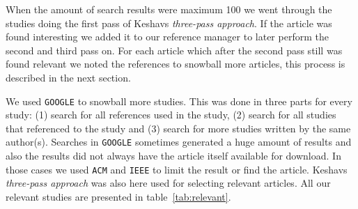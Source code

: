\documentclass[11pt, oneside]{article}   	%
\begin{document}
\FloatBarrier
{}
When the amount of search results were maximum 100 we went through the studies doing the first pass of Keshavs \emph{three-pass approach}\cite{Keshav}. If the article was found interesting we added it to our reference manager to later perform the second and third pass on. For each article which after the second pass still was found relevant we noted the references to snowball more articles, this process is described in the next section. 

We used \texttt{GOOGLE} to snowball more studies. This was done in three parts for every study: (1) search for all references used in the study, (2) search for all studies that referenced to the study and (3) search for more studies written by the same author(s). Searches in \texttt{GOOGLE} sometimes generated a huge amount of results and also the results did not always have the article itself available for download. In those cases we used \texttt{ACM} and \texttt{IEEE} to limit the result or find the article. Keshavs \emph{three-pass approach} was also here used for selecting relevant articles\cite{Keshav}. All our relevant studies are presented in table~\ref{tab:relevant}.
\end{document}
